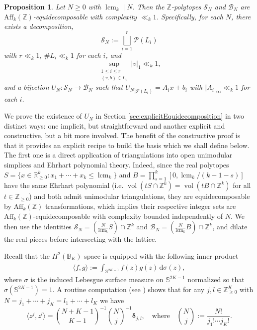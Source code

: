 \documentclass[a4paper,reqno,12pt]{amsart}
\theoremstyle{plain}
\newtheorem{proposition}[theorem]{Proposition}
\theoremstyle{plain}
\theoremstyle{remark}
\theoremstyle{plain}
\newcommand{\B}{\mathscr{B}}
\newcommand{\cP}{\mathscr{P}}
\newcommand{\cS}{\mathscr{S}}
\newcommand{\z}{\mathbb{Z}}
\newcommand{\RR}{\mathbb{R}}
\newcommand{\bo}{\boldsymbol}
\newcommand{\si}{\sigma}
\newcommand{\ov}{\overline}
\newcommand{\dd}{\mathrm{d}}
\newcommand{\aff}{\text{Aff}}
\newcommand{\Sphere}{\mathbb{S}}
\newcommand{\Z}{\mathbb{Z}}
\newcommand{\vol}{\operatorname{vol}}
\newcommand{\lcmk}{\operatorname{lcm}_k}
\theoremstyle{plain}
\theoremstyle{plain}
\begin{document}
{\begin{proposition}\label{prop:UNmap}
Let {$N\geq0$ with} $\lcmk \mid N$. Then the $\Z$-polytopes $\cS_N$ and $\B_N$ are $\aff_k(\Z)$-equidecomposable with complexity $\ll_k 1$. Specifically, for each $N$, there exists a decomposition, 
$$
\cS_N := \bigsqcup_{i=1}^r {\cP(L_i)}
$$
with $r \ll_k 1$, $\#L_i \ll_k 1$ for each $i$, and 
$$
\sup_{\substack{1 \leq i \leq r \\ (v,b) \in L_i}} |v|_1 \ll_k 1,
$$
and a bijection $U_N : \cS_N \to \B_N$ such that ${U_N}_{|\cP(L_i)} = A_i x + b_i$
with $|A_i|_{\infty} \ll_k 1$ for each $i$.
\end{proposition}

We prove the existence of $U_N$ in Section \ref{sec:explicitEquidecomposition} in two distinct ways: one implicit, but straightforward and another explicit and constructive, but a bit more involved. The benefit of the constructive proof is that it {provides an explicit recipe} to build the basis which we shall define below. The first one is a direct application of triangulations into open unimodular simplices and Ehrhart polynomial theory. Indeed, since the real polytopes $S=\{x\in {\RR_{\geq0}^k} : x_1+\cdots+x_k \leq \lcmk\}$ and  $B=\prod_{s=1}^k [0,\lcmk/(k+1-s)]$ have the same Ehrhart polynomial (i.e. $\vol(tS \cap \Z^k)=\vol(t B \cap \Z^k)$ for all $t\in \Z_{\geq 0}$) {and both admit unimodular triangulations,} they are equidecomposable by $ \aff_k(\z)$ transformations, which implies their respective integer sets are $\aff_k(\Z)$-equidecomposable with complexity bounded {independently} of $N$.  {We then use the identities $\cS_N = (\frac{N}{\lcmk}S)\cap\Z^k$ and $\B_N = (\frac{N}{\lcmk}B)\cap\Z^k$, and dilate the real pieces before intersecting with the lattice.}


Recall that {the} $H^2(\mathbb B_K)$ space is equipped with the following
inner product 
\begin{align*}
 \langle f,g\rangle
 :=
 \int_{\Sphere^{2K-1}}f(z)\ov{g(z)}\,\dd\sigma(z),
\end{align*}
where $\si$ is the induced Lebesgue surface measure on $\Sphere^{2K-1}$ normalized so that $\si (\Sphere^{2K-1})=1$.
A routine computation (see \cite{R}) shows that for any $j,l \in \z_{\geq 0}^K$ {with $N=j_1+\cdots+j_K=l_1+\cdots+l_K$} we have
\begin{equation}\label{def:innerprod}
 \langle z^j,z^l\rangle
 =\binom{N+K-1}{K-1}^{-1}\binom Nj^{-1}{\bo \delta}_{j,l},
 \quad \text{where} \quad
 \binom Nj:=\frac{N!}{j_1!\cdots j_K!}.
\end{equation}

}
\end{document}
